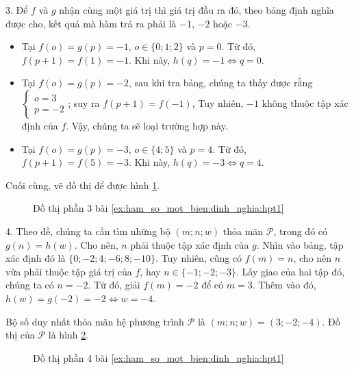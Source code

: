 3. Để $f$ và $g$ nhận cùng một giá trị thì giá trị đầu ra đó, theo bảng định nghĩa được cho, kết quả mà hàm trả ra phải là $-1$, $-2$ hoặc $-3$.
\begin{itemize}
   \item Tại $f(o) = g(p) = -1$, $o \in \{0; 1; 2\}$ và $p = 0$. Từ đó, $f(p + 1) = f(1) = -1$. Khi này, $h(q) = -1 \iff q = 0$.
   \item Tại $f(o) = g(p) = -2$, sau khi tra bảng, chúng ta thấy được rằng $\begin{cases}o = 3\\p = -2\end{cases}$; suy ra $f(p + 1) = f(-1)$, Tuy nhiên, $-1$ không thuộc tập xác định của $f$. Vậy, chúng ta sẽ loại trường hợp này.
   \item Tại $f(o) = g(p) = -3$, $o \in \{4; 5\}$ và $p = 4$. Từ đó, $f(p + 1) = f(5) = -3$. Khi này, $h(q) = -3 \iff q = 4$.
\end{itemize}
Cuối cùng, vẽ đồ thị để được hình \ref{fig:hpt13}.

\begin{figure}[H]
   \centering
   \caption{Đồ thị phần 3 bài \ref{ex:ham_so_mot_bien:dinh_nghia:hpt1}}
   \label{fig:hpt13}
\end{figure}

4. Theo đề, chúng ta cần tìm những bộ $(m;n;w)$ thỏa mãn $\mathcal{P}$, trong đó có $g(n) = h(w)$. Cho nên, $n$ phải thuộc tập xác định của $g$. Nhìn vào bảng, tập xác định đó là $\{0; -2; 4; -6; 8; -10\}$. Tuy nhiên, cũng có $f(m) = n$, cho nên $n$ vừa phải thuộc tập giá trị của $f$, hay $n \in \{-1; -2; -3\}$. Lấy giao của hai tập đó, chúng ta có $n = -2$. Từ đó, giải $f(m) = -2$ để có $m = 3$. Thêm vào đó, $h(w) = g(-2) = -2 \iff w = -4$.

Bộ số duy nhất thỏa mãn hệ phương trình $\mathcal{P}$ là $\left(m; n; w\right) = \left(3; -2; -4\right)$. Đồ thị của $\mathcal{P}$ là hình \ref{fig:hpt14}.

\begin{figure}[H]
   \centering
   \caption{Đồ thị phần 4 bài \ref{ex:ham_so_mot_bien:dinh_nghia:hpt1}}
   \label{fig:hpt14}
\end{figure}